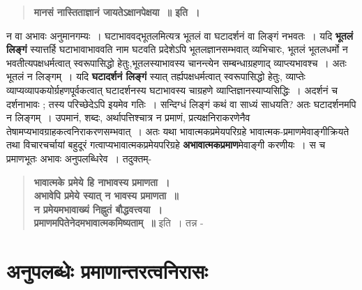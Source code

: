{\begin{verse}
\textbf{मानसं नास्तिताज्ञानं जायतेऽक्षानपेक्षया~॥  इति~। }
\end{verse}  
न वा अभावः अनुमानगम्यः~। घटाभाववद्भूतलमित्यत्र भूतलं वा घटादर्शनं वा लिङ्गं न\break भवतः~। यदि \textbf{भूतलं लिङ्गं} स्यात्तर्हि घटाभावाभाववति नाम घटवति प्रदेशेऽपि भूतलज्ञान\-सम्भवात् व्यभिचारः, भूतलं भूतलधर्मो न भवतीत्यपक्षधर्मत्वात् स्वरूपासिद्धो हेतुः,\break भूतलस्या\-भावस्य चानन्त्येन सम्बन्धाग्रहणाद् व्याप्त्यभावश्च~। अतः भूतलं न लिङ्गम्~।  यदि \textbf{घटादर्शनं लिङ्गं} स्यात् तर्ह्यपक्षधर्मत्वात् स्वरूपासिद्धो हेतुः, व्याप्तेः व्याप्यव्यापकयोर्ग्रहणपूर्वकत्वात् घटा\-दर्शनस्य घटाभावस्य चाग्रहणे व्याप्तिज्ञानस्याप्यसिद्धिः~। अदर्शनं च दर्शनाभावः ; तस्य परिच्छेदेऽपि इयमेव गतिः~। सन्दिग्धं लिङ्गं कथं वा साध्यं साधयति? अतः घटादर्शनमपि न लिङ्गम्~। उपमानं, शब्दः, अर्थापत्तिश्चात्र न प्रमाणं, प्रत्यक्षनिराकरणेनैव तेषामप्यभावग्राहकत्वनिराकरणसम्भवात्~। अतः यथा भावात्मकप्रमेयपरिग्रहे भावात्मक-प्रमाणमेवाङ्गीक्रियते तथा विचारचर्चायां बहुदूरं गत्वाप्यभावात्मकप्रमेयपरिग्रहे \textbf{अभावात्मकप्रमाण}मेवाङ्गी करणीयः~। स च प्रमाणभूतः अभावः अनुपलब्धिरेव~। तदुक्तम्-
\newpage

\begin{verse}
\textbf{भावात्मके प्रमेये हि नाभावस्य प्रमाणता~। \\
अभावेपि प्रमेये स्यात् न भावस्य प्रमाणता~॥\\
न प्रमेयमभावाख्यं निह्नुतं बौद्धवत्त्वया~। \\
प्रमाणमपितेनेदमभावात्मकमिष्यताम्~॥} इति~। तन्न -
\end{verse}

\section*{अनुपलब्धेः प्रमाणान्तरत्वनिरासः} 

}
